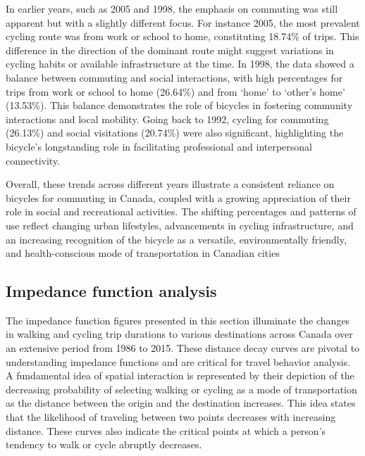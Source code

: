 \documentclass[
11pt, %
oneside, %
english, %
singlespacing, %
]{macthesis} %
\begin{document}
In earlier years, such as 2005 and 1998, the emphasis on commuting was still apparent but with a slightly different focus. For instance 2005, the most prevalent cycling route was from work or school to home, constituting 18.74\% of trips. This difference in the direction of the dominant route might suggest variations in cycling habits or available infrastructure at the time. In 1998, the data showed a balance between commuting and social interactions, with high percentages for trips from work or school to home (26.64\%) and from `home' to `other's home' (13.53\%). This balance demonstrates the role of bicycles in fostering community interactions and local mobility. Going back to 1992, cycling for commuting (26.13\%) and social visitations (20.74\%) were also significant, highlighting the bicycle's longstanding role in facilitating professional and interpersonal connectivity.

Overall, these trends across different years illustrate a consistent reliance on bicycles for commuting in Canada, coupled with a growing appreciation of their role in social and recreational activities. The shifting percentages and patterns of use reflect changing urban lifestyles, advancements in cycling infrastructure, and an increasing recognition of the bicycle as a versatile, environmentally friendly, and health-conscious mode of transportation in Canadian cities

\subsection{Impedance function analysis}\label{impedance-function-analysis}

The impedance function figures presented in this section illuminate the changes in walking and cycling trip durations to various destinations across Canada over an extensive period from 1986 to 2015. These distance decay curves are pivotal to understanding impedance functions and are critical for travel behavior analysis. A fundamental idea of spatial interaction is represented by their depiction of the decreasing probability of selecting walking or cycling as a mode of transportation as the distance between the origin and the destination increases. This idea states that the likelihood of traveling between two points decreases with increasing distance. These curves also indicate the critical points at which a person's tendency to walk or cycle abruptly decreases.
\end{document}

